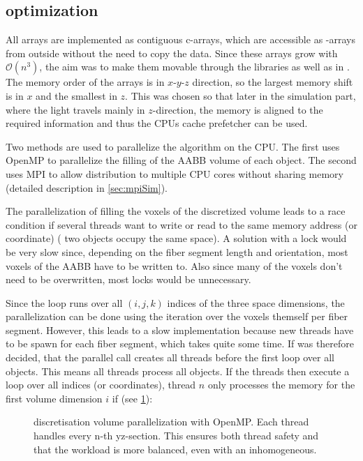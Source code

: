 \subsection{optimization}\label{sec:dvOpti}
%
All arrays are implemented as contiguous c-arrays, which are accessible as -arrays from outside without the need to copy the data.
Since these arrays grow with $\mathcal{O}(n^3)$, the aim was to make them movable through the \cpp{} libraries as well as in \python{}.
The memory order of the arrays is in $x\text{-}y\text{-}z$ direction, so the largest memory shift is in $x$ and the smallest in $z$.
This was chosen so that later in the simulation part, where the light travels mainly in $z$-direction, the memory is aligned to the required information and thus the \acp{CPU} cache prefetcher can be used.
\par
%
Two methods are used to parallelize the algorithm on the \ac{CPU}.
The first uses \ac{OpenMP} to parallelize the filling of the \ac{AABB} volume of each object.
The second uses \ac{MPI} to allow distribution to multiple \ac{CPU} cores without sharing memory (detailed description in \cref{sec:mpiSim}).
\par
%
The parallelization of filling the voxels of the discretized volume leads to a race condition if several threads want to write or read to the same memory address (or coordinate) (\eg{} two objects occupy the same space).
A solution with a lock would be very slow since, depending on the fiber segment length and orientation, most voxels of the \ac{AABB} have to be written to.
Also since many of the voxels don't need to be overwritten, most locks would be unnecessary.
\par
Since the loop runs over all $(i,j,k)$ indices of the three space dimensions, the parallelization can be done using the iteration over the voxels themself per fiber segment.
However, this leads to a slow implementation because new threads have to be spawn for each fiber segment, which takes quite some time.
If was therefore decided, that the parallel call creates all threads before the first loop over all objects.
This means all threads process all objects.
If the threads then execute a loop over all indices (or coordinates), thread $n$ only processes the memory for the first volume dimension $i$ if (see \cref{fig:discVolThread}):
%
\begin{figure}[!t]
\centering
\setlength{\tikzwidth}{0.5\textwidth}
\caption[discretized volume parallelization]{discretisation volume parallelization with \ac{OpenMP}. Each thread handles every n-th yz-section. This ensures both thread safety and that the workload is more balanced, even with an inhomogeneous.}
\label{fig:discVolThread}
\end{figure}
